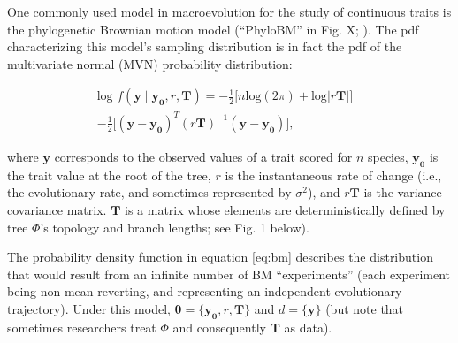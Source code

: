 \documentclass[oneside]{article}
\begin{document}
\begin{tcolorbox}[breakable, width=\textwidth, colback=gray!10, boxrule=0pt,
  title=Box 1: Models characterized by well-known parametric distributions, fonttitle=\bfseries]
  \small 
  One commonly used model in macroevolution for the study
of continuous traits is the phylogenetic Brownian motion model (``PhyloBM'' in Fig. X;
\citealt{felsenstein73}).
The pdf characterizing this model's sampling distribution is in fact
the pdf of the multivariate normal (MVN) probability distribution:

\begin{equation}
  \begin{split}
    \text{log }f(\boldsymbol{y} \mid \boldsymbol{y_0}, r, \boldsymbol{T}) = -\frac{1}{2} \Big[ n\text{log}(2\pi) + \text{log}|r \boldsymbol{T}| \Big] & \\
    -\frac{1}{2} \Big[ (\mathbf{y} - \boldsymbol{y_0})^T (r \boldsymbol{T})^{-1} (\mathbf{y} - \boldsymbol{y_0}) \Big],
  \label{eq:bm}
  \end{split}
\end{equation}

\noindent where $\boldsymbol{y}$ corresponds to the observed values of a trait
scored for $n$ species, $\boldsymbol{y_0}$ is the trait value at the root of the tree,
$r$ is the instantaneous rate of change (i.e., the evolutionary rate, and sometimes
represented by $\sigma^2$), and $r\boldsymbol{T}$ is the variance-covariance matrix.
$\boldsymbol{T}$ is a matrix whose elements are deterministically defined by tree
$\Phi$'s topology and branch lengths; see Fig. 1 below).

\vspace{.25cm}
The probability density function in equation \eqref{eq:bm} describes the distribution
that would result from an infinite number of BM ``experiments'' (each experiment
being non-mean-reverting, and representing an independent evolutionary trajectory).
Under this model, $\boldsymbol{\theta} = \{\boldsymbol{y_0}, r, \boldsymbol{T}\}$ and
$d = \{\boldsymbol{y}\}$ (but note that sometimes researchers treat $\Phi$ and
consequently $\boldsymbol{T}$ as
data).


\end{tcolorbox}
\end{document}
